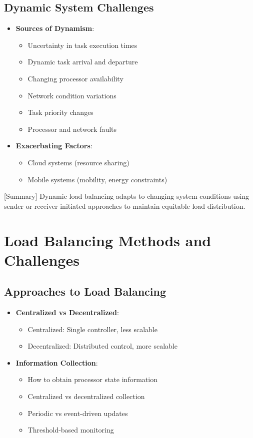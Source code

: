 \documentclass[12pt]{article}
\begin{document}
\subsection{Dynamic System Challenges}
\begin{itemize}
  \item \textbf{Sources of Dynamism}:
        \begin{itemize}
          \item Uncertainty in task execution times
          \item Dynamic task arrival and departure
          \item Changing processor availability
          \item Network condition variations
          \item Task priority changes
          \item Processor and network faults
        \end{itemize}

  \item \textbf{Exacerbating Factors}:
        \begin{itemize}
          \item Cloud systems (resource sharing)
          \item Mobile systems (mobility, energy constraints)
        \end{itemize}
\end{itemize}

[Summary] Dynamic load balancing adapts to changing system conditions using sender or receiver initiated approaches to maintain equitable load distribution.

\section{Load Balancing Methods and Challenges}

\subsection{Approaches to Load Balancing}
\begin{itemize}
  \item \textbf{Centralized vs Decentralized}:
        \begin{itemize}
          \item Centralized: Single controller, less scalable
          \item Decentralized: Distributed control, more scalable
        \end{itemize}

  \item \textbf{Information Collection}:
        \begin{itemize}
          \item How to obtain processor state information
          \item Centralized vs decentralized collection
          \item Periodic vs event-driven updates
          \item Threshold-based monitoring
        \end{itemize}
\end{itemize}
\end{document}
